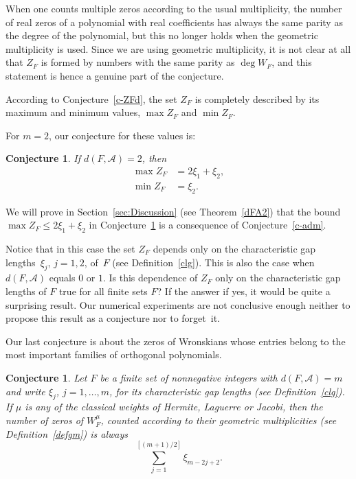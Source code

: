 \documentclass[10pt]{article}
\theoremstyle{plain}
\newtheorem{conjecture}[theorem]{Conjecture}
\newtheorem{subconj}[theorem]{Conjecture}%
\theoremstyle{definition}
\numberwithin{equation}{section} %
\newcommand\Ad{\mathcal{A}}
\begin{document}
When one counts multiple zeros according to the usual multiplicity, the number of real zeros of a polynomial with real coefficients has always the  same parity as the degree of the polynomial, but this no longer holds when the geometric multiplicity is used. Since we are using geometric multiplicity, it is not clear at all that $Z_F$ is formed by numbers with the same parity as $\deg W_F$, and this statement is hence a genuine part of the conjecture.

According to Conjecture~\ref{c-ZFd}, the set $Z_F$ is completely described by its maximum and minimum values, $\max Z_F$ and $\min Z_F$.

For $m=2$, our conjecture for these values is:

\begin{subconj}
\label{sc-ZFd2}
If $d(F,\Ad)=2$, then
\begin{align*}
   \max Z_F &= 2 \xi_1 + \xi_2,
   \\
   \min Z_F &= \xi_2.
\end{align*}
\end{subconj}

We will prove in Section~\ref{sec:Discussion} (see Theorem~\ref{dFA2}) that the bound
$\max Z_F \le 2 \xi_1 + \xi_2$ in Conjecture~\ref{sc-ZFd2} is a consequence of Conjecture~\ref{c-adm}.

Notice that in this case the set $Z_F$ depends only on the characteristic gap lengths~$\xi_j$, $j=1,2$, of~$F$ (see Definition~\ref{clg}). This is also the case when $d(F,\Ad)$ equals $0$ or $1$. Is this dependence of $Z_F$ only on the characteristic gap lengths of $F$ true for all finite sets $F$? If the answer if yes, it would be quite a surprising result. Our numerical experiments are not conclusive enough neither to propose this result as a conjecture nor to forget~it.

Our last conjecture is about the zeros of Wronskians whose entries belong to the most important families of orthogonal polynomials.

\begin{conjecture}\label{c-ZFdclas}
Let $F$ be a finite set of nonnegative integers with  $d(F,\Ad)=m$ and write $\xi_j$, $j=1,\dots,m$, for its characteristic gap lengths (see Definition~\ref{clg}). If $\mu$ is any of the classical weights of Hermite, Laguerre or Jacobi, then the number of zeros of $W_F^\mu$, counted according to their geometric multiplicities (see Definition~\ref{defgm}) is always
\[
  \sum_{j=1}^{[(m+1)/2]}\xi _{m-2j+2}.
\]
\end{conjecture}
\end{document}
